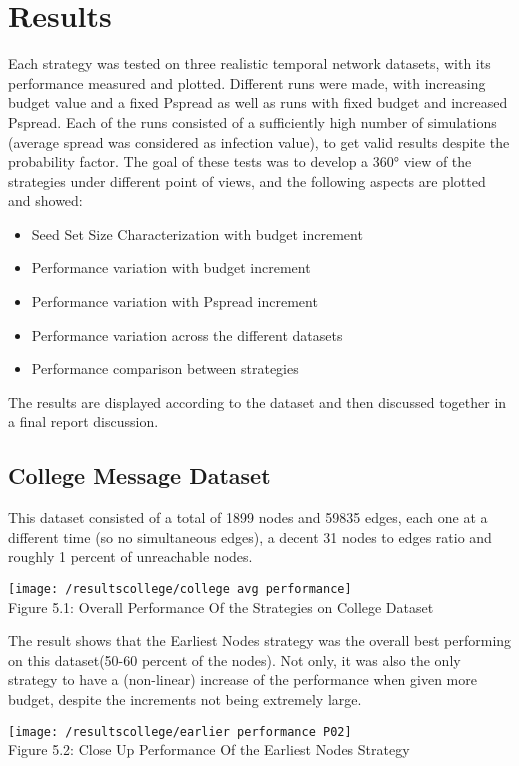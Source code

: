 \chapter{Results}
\label{cha:conclusion}
Each strategy was tested on three realistic temporal network datasets, with its performance measured and plotted. Different runs were made, with increasing budget value and a fixed Pspread as well as runs with fixed budget and increased Pspread. Each of the runs consisted of a sufficiently high number of simulations (average spread was considered as infection value), to get valid results despite the probability factor. The goal of these tests was to develop a 360° view of the strategies under different point of views, and the following aspects are plotted and showed:
\begin{itemize}
    \item Seed Set Size Characterization with budget increment
    \item Performance variation with budget increment
    \item Performance variation with Pspread increment
    \item Performance variation across the different datasets
    \item Performance comparison between strategies
\end{itemize}
The results are displayed according to the dataset and then discussed together in a final report discussion.

\section{College Message Dataset}
\label{sec:collegeres}
This dataset consisted of a total of 1899 nodes and 59835 edges, each one at a different time (so no simultaneous edges), a decent 31 nodes to edges ratio and roughly 1 percent of unreachable nodes.
\begin{center}
    \texttt{[image: /resultscollege/college avg performance]}
    \\
    Figure 5.1: Overall Performance Of the Strategies on College Dataset
\end{center}

The result shows that the Earliest Nodes strategy was the overall best performing on this dataset(50-60 percent of the nodes). Not only, it was also the only strategy to have a (non-linear) increase of the performance when given more budget, despite the increments not being extremely large.
\begin{center}
    \texttt{[image: /resultscollege/earlier performance P02]}
    \\
    Figure 5.2: Close Up Performance Of the Earliest Nodes Strategy
\end{center}

